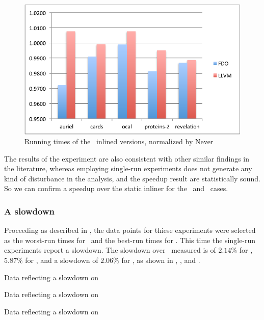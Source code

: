 \begin{figure}
  \centering
  \includegraphics[width=1.00\linewidth]{Figures/speedup}
  \caption{Running times of the \gzip\ inlined versions, normalized by Never}
  \label{fig:speedupz}
\end{figure}

The results of the experiment are also consistent with other similar findings in the literature, whereas employing single-run experiments does not generate any kind of disturbance in the analysis, and the speedup result are statistically sound. So we can confirm a speedup over the static inliner for the \bzip\ and \gzip\ cases.

\subsubsection{A slowdown}
\label{sec:slowdown}

Proceeding as described in , the data points for thiese experiments were selected as the worst-run times for \FDI\ and the best-run times for \llvm. This time the single-run experiments report a slowdown. The slowdown over \llvm\ measured is of $2.14 \%$ for \bzip, $5.87 \%$ for \gzip, and a slowdown of $2.06 \%$ for \gcc, as shown in , , and .

\begin{table}
  \centering
  \begin{tiny}
  
  \end{tiny}
  \caption{Data reflecting a slowdown on \bzip}
  \label{tab:slowdownb}
\end{table}

\begin{table}
  \centering
  \begin{tiny}
  
  \end{tiny}
  \caption{Data reflecting a slowdown on \gzip}
  \label{tab:slowdownz}
\end{table}

\begin{table}
  \centering
  \begin{tiny}
  
  \end{tiny}
  \caption{Data reflecting a slowdown on \gcc}
  \label{tab:slowdowngcc}
\end{table}
